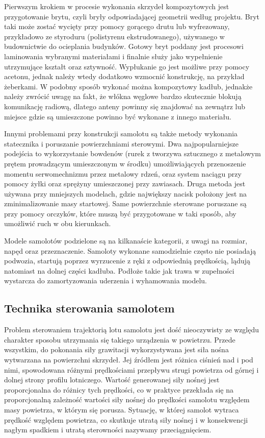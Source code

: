 \documentclass[12pt, a4paper]{article}
\begin{document}
Pierwszym krokiem w procesie wykonania skrzydeł kompozytowych jest przygotowanie brytu, czyli bryły odpowiadającej geometrii według projektu. Bryt taki może zostać wycięty przy pomocy gorącego drutu lub wyfrezowany, przykładowo ze styroduru (polistyrenu ekstrudowanego), używanego w budownictwie do ocieplania budynków. Gotowy bryt poddany jest procesowi laminowania wybranymi materiałami i finalnie służy jako wypełnienie utrzymujące kształt oraz sztywność. Wypłukanie go jest możliwe przy pomocy acetonu, jednak należy wtedy dodatkowo wzmocnić konstrukcję, na przykład żeberkami. W podobny sposób wykonać można kompozytowy kadłub, jednakże należy zwrócić uwagę na fakt, że włókna węglowe bardzo skutecznie blokują komunikację radiową, dlatego anteny powinny się znajdować na zewnątrz lub miejsce gdzie są umieszczone powinno być wykonane z innego materiału.

Innymi problemami przy konstrukcji samolotu są także metody wykonania statecznika i poruszanie powierzchniami sterowymi. Dwa najpopularniejsze podejścia to wykorzystanie bowdenów (rurek z tworzywa sztucznego z metalowym prętem prowadzącym umieszczonym w środku) umożliwiających przenoszenie momentu serwomechnizmu przez metalowy rdzeń, oraz system naciągu przy pomocy żyłki oraz sprężyny umieszczonej przy zawiasach. Druga metoda jest używana przy mniejszych modelach, gdzie największy nacisk położony jest na zminimalizowanie masy startowej. Same powierzchnie sterowane poruszane są przy pomocy orczyków, które muszą być przygotowane w taki sposób, aby umożliwić ruch w obu kierunkach.

Modele samolotów podzielone są na kilkanaście kategorii, z uwagi na rozmiar, napęd oraz przeznaczenie. Samoloty wykonane samodzielnie często nie posiadają podwozia, startują poprzez wyrzucenie z ręki z odpowiednią prędkością, lądują natomiast na dolnej części kadłuba. Podłoże takie jak trawa w zupełności wystarcza do zamortyzowania uderzenia i wyhamowania modelu.
 

\subsection{Technika sterowania samolotem}
Problem sterowaniem trajektorią lotu samolotu jest dość nieoczywisty ze względu charakter sposobu utrzymania się takiego urządzenia w powietrzu. Przede wszystkim, do pokonania siły grawitacji wykorzystywana jest siła nośna wytwarzana na powierzchni skrzydeł. Jej źródłem jest różnica ciśnień nad i pod nimi, spowodowana różnymi prędkościami przepływu strugi powietrza od górnej i dolnej strony profilu lotniczego. Wartość generowanej siły nośnej jest proporcjonalna do różnicy tych prędkości, co w praktyce przekłada się na proporcjonalną zależność wartości siły nośnej do prędkości samolotu względem masy powietrza, w którym się porusza. Sytuację, w której samolot wytraca prędkość względem powietrza, co skutkuje utratą siły nośnej i w konsekwencji nagłym spadkiem i utratą sterowności nazywamy przeciągnięciem.
\end{document}

